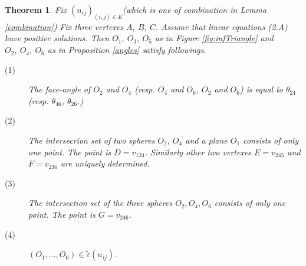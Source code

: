 \documentclass[suppldata, dvipdfmx]{interact}
\theoremstyle{plain}%
\newtheorem{theorem}{Theorem}[section]
\theoremstyle{definition}
\theoremstyle{remark}
\theoremstyle{problemstyle}
\begin{document}
\begin{theorem}\label{compat}
 Fix $(n_{ij})_{(i, j)\in E}$(which is one of combination in Lemma
 \ref{combination})
 Fix three vertexes $A,~B,~C$. Assume that linear equations (2.A) have
 positive solutions. Then $O_1,~O_3,~O_5$ as in Figure \ref{fig:infTriangle} and
 $O_2,~O_4,~O_6$ as in Proposition \ref{angles} satisfy followings.
 \begin{description}
  \item[(1)] The face-angle of $O_2$ and $O_4$ (resp. $O_4$ and $O_6$,
             $O_2$ and $O_6$) is equal to $\theta_{24}$
             (resp. $\theta_{46}$, $\theta_{26}$.)
  \item[(2)] The intersecrion set of two spheres $O_2$, $O_4$ and a plane
             $O_1$ consists of only one point. The point is 
             $D = v_{124}$. Similarly other two vertexes $E = v_{245}$
             and $F = v_{236}$ are uniquely determined.
  \item[(3)] The intersection set of the three spheres $O_2, O_4, O_6$
             consists of only one point. The point is $G = v_{246}$.
             
  \item[(4)] $(O_1, ..., O_6) \in \tilde\varepsilon(n_{ij})$.
\end{description}
\end{theorem}
\end{document}
